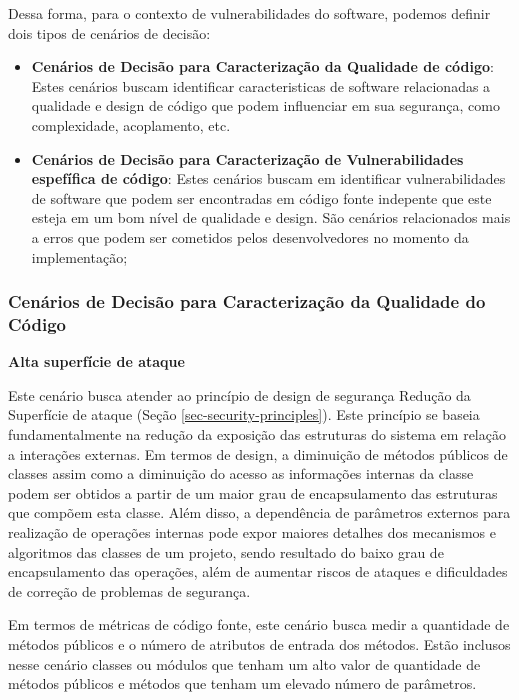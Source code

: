 %

Dessa forma, para o contexto de vulnerabilidades do software, podemos definir dois tipos de cenários de decisão:

%

\begin{itemize}
\item \textbf{Cenários de Decisão para Caracterização da Qualidade de código}: Estes cenários buscam identificar caracteristicas de software relacionadas a qualidade e design de código que podem influenciar em sua segurança, como complexidade, acoplamento, etc.
\item \textbf{Cenários de Decisão para Caracterização de Vulnerabilidades espefífica de código}: Estes cenários buscam em identificar vulnerabilidades de software que podem ser encontradas em código fonte indepente que este esteja em um bom nível de qualidade e design. São cenários relacionados mais a erros que podem ser cometidos pelos desenvolvedores no momento da implementação;
\end{itemize}

%

\subsubsection{Cenários de Decisão para Caracterização da Qualidade do Código }

%

\textbf{Alta superfície de ataque}

%

Este cenário busca atender ao princípio de design de segurança Redução da Superfície de ataque (Seção \ref{sec-security-principles}). Este princípio se baseia fundamentalmente na redução da exposição das estruturas do sistema em relação a interações externas. Em termos de design, a diminuição de métodos públicos de classes assim como a diminuição do acesso as informações internas da classe podem ser obtidos a partir de um maior grau de encapsulamento das estruturas que compõem esta classe. Além disso, a dependência de parâmetros externos para realização de operações internas pode expor maiores detalhes dos mecanismos e algoritmos das classes de um projeto, sendo resultado do baixo grau de encapsulamento das operações, além de aumentar riscos de ataques e dificuldades de correção de problemas de segurança. 

%

Em termos de métricas de código fonte, este cenário busca medir a quantidade de métodos públicos e o número de atributos de entrada dos métodos. Estão inclusos nesse cenário classes ou módulos que tenham um alto valor de quantidade de métodos públicos e métodos que tenham um elevado número de parâmetros. 

